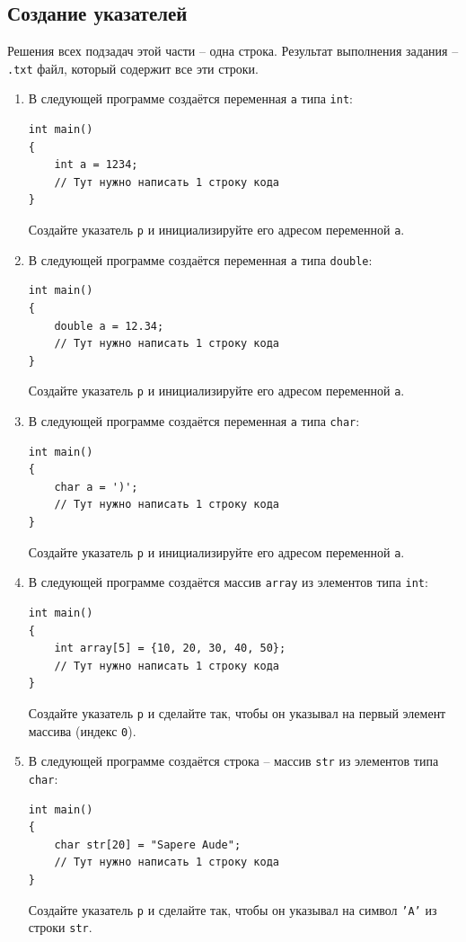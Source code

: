 \documentclass{article}
\begin{document}
\subsection{Создание указателей}
Решения всех подзадач этой части -- одна строка. Результат выполнения задания -- \texttt{.txt} файл, который содержит все эти строки.

\begin{enumerate}
\item В следующей программе создаётся переменная \texttt{a} типа \texttt{int}:
\begin{lstlisting}
int main() 
{
    int a = 1234;
    // Тут нужно написать 1 строку кода
}
\end{lstlisting}
Создайте указатель \texttt{p} и инициализируйте его адресом переменной \texttt{a}.


\item В следующей программе создаётся переменная \texttt{a} типа \texttt{double}:
\begin{lstlisting}
int main() 
{
    double a = 12.34;
    // Тут нужно написать 1 строку кода
}
\end{lstlisting}
Создайте указатель \texttt{p} и инициализируйте его адресом переменной \texttt{a}.

\item В следующей программе создаётся переменная \texttt{a} типа \texttt{char}:
\begin{lstlisting}
int main() 
{
    char a = ')';
    // Тут нужно написать 1 строку кода
}
\end{lstlisting}
Создайте указатель \texttt{p} и инициализируйте его адресом переменной \texttt{a}.

\item В следующей программе создаётся массив \texttt{array} из элементов типа \texttt{int}:
\begin{lstlisting}
int main() 
{
    int array[5] = {10, 20, 30, 40, 50};
    // Тут нужно написать 1 строку кода
}
\end{lstlisting}
Создайте указатель \texttt{p} и сделайте так, чтобы он указывал на первый элемент массива (индекс \texttt{0}).


\item В следующей программе создаётся строка -- массив \texttt{str} из элементов типа \texttt{char}:
\begin{lstlisting}
int main() 
{
    char str[20] = "Sapere Aude";
    // Тут нужно написать 1 строку кода
}
\end{lstlisting}
Создайте указатель \texttt{p} и сделайте так, чтобы он указывал на символ \texttt{'A'}  из строки \texttt{str}.
\end{enumerate}
\end{document}
